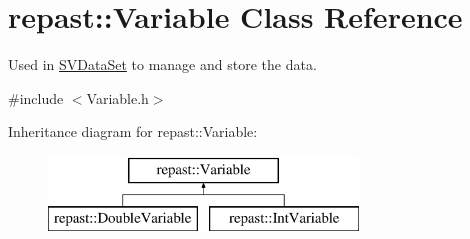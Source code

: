 \hypertarget{classrepast_1_1_variable}{\section{repast\-:\-:Variable Class Reference}
\label{classrepast_1_1_variable}
}


Used in \hyperlink{classrepast_1_1_s_v_data_set}{S\-V\-Data\-Set} to manage and store the data.  




{\ttfamily \#include $<$Variable.\-h$>$}

Inheritance diagram for repast\-:\-:Variable\-:\begin{figure}[H]
\begin{center}
\leavevmode
\includegraphics[height=2.000000cm]{classrepast_1_1_variable}
\end{center}
\end{figure}
